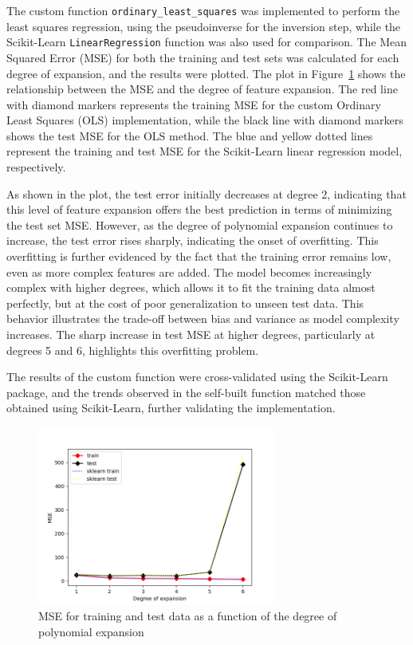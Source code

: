 \documentclass{article}
\begin{document}
The custom function \texttt{ordinary\_least\_squares} was implemented to perform the least squares regression, using the pseudoinverse for the inversion step, while the Scikit-Learn \texttt{LinearRegression} function was also used for comparison. The Mean Squared Error (MSE) for both the training and test sets was calculated for each degree of expansion, and the results were plotted. The plot in Figure~\ref{fig:mse_vs_degree} shows the relationship between the MSE and the degree of feature expansion. The red line with diamond markers represents the training MSE for the custom Ordinary Least Squares (OLS) implementation, while the black line with diamond markers shows the test MSE for the OLS method. The blue and yellow dotted lines represent the training and test MSE for the Scikit-Learn linear regression model, respectively.

As shown in the plot, the test error initially decreases at degree 2, indicating that this level of feature expansion offers the best prediction in terms of minimizing the test set MSE. However, as the degree of polynomial expansion continues to increase, the test error rises sharply, indicating the onset of overfitting. This overfitting is further evidenced by the fact that the training error remains low, even as more complex features are added. The model becomes increasingly complex with higher degrees, which allows it to fit the training data almost perfectly, but at the cost of poor generalization to unseen test data. This behavior illustrates the trade-off between bias and variance as model complexity increases. The sharp increase in test MSE at higher degrees, particularly at degrees 5 and 6, highlights this overfitting problem.

The results of the custom function were cross-validated using the Scikit-Learn package, and the trends observed in the self-built function matched those obtained using Scikit-Learn, further validating the implementation.


\begin{figure}[h!]
    \centering
    \includegraphics[width=0.7\textwidth]{sln_figures/fig4_3.png}
    \caption{MSE for training and test data as a function of the degree of polynomial expansion}
    \label{fig:mse_vs_degree}
\end{figure}
\end{document}
